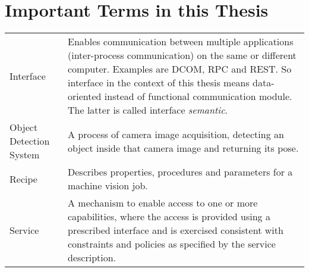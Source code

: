 \chapter*{Important Terms in this Thesis}
\thispagestyle{empty}

\extrarowsep=0.6cm\begin{tabu} to \linewidth{lX}
    Interface & Enables communication between multiple applications (inter-process communication) on the same or different computer. Examples are DCOM, RPC and REST. So interface in the context of this thesis means data-oriented instead of functional communication module. The latter is called interface \textit{semantic}.\\ 
    Object Detection System & A process of camera image acquisition, detecting an object inside that camera image and returning its pose.\\
    Recipe &  	Describes properties, procedures and parameters for a machine vision job. \cite{VDMA2018OPCSpecification}	 \\ 
    Service & A mechanism to enable access to one or more capabilities, where the access is provided using a prescribed interface and is exercised consistent with constraints and policies as specified by the service description. \cite{MacKenzie2006ReferenceStandard}
\end{tabu}
\endinput